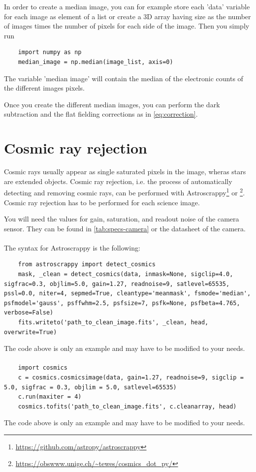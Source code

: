 \documentclass[a4paper, 11pt, fleqn]{memoir}
\begin{document}
In order to create a median image, you can for example store each 'data' variable for each image as element of a list or create a 3D array having size as the number of images times the number of pixels for each side of the image.
Then you simply run
\begin{verbatim}
    import numpy as np
    median_image = np.median(image_list, axis=0)
\end{verbatim}
The variable 'median image' will contain the median of the electronic counts of the different images pixels.


Once you create the different median images, you can perform the dark subtraction and the flat fielding corrections as in \cref{eq:correction}.

\section{Cosmic ray rejection}
\label{ssec:cosmic-ray-rejection}
Cosmic rays usually appear as single saturated pixels in the image, wheras stars are extended objects.
Cosmic ray rejection, i.e. the process of automatically detecting and removing cosmic rays, can be performed with Astroscrappy\footnote{\url{https://github.com/astropy/astroscrappy}} or \footnote{\url{https://obswww.unige.ch/~tewes/cosmics_dot_py/}}.
Cosmic ray rejection has to be performed for each science image.

You will need the values for gain, saturation, and readout noise of the camera sensor.
They can be found in \cref{tab:specs-camera} or the datasheet of the camera.

\paragraph{}
The syntax for Astroscrappy is the following:
\begin{verbatim}
    from astroscrappy import detect_cosmics
    mask, _clean = detect_cosmics(data, inmask=None, sigclip=4.0, sigfrac=0.3, objlim=5.0, gain=1.27, readnoise=9, satlevel=65535, pssl=0.0, niter=4, sepmed=True, cleantype='meanmask', fsmode='median', psfmodel='gauss', psffwhm=2.5, psfsize=7, psfk=None, psfbeta=4.765, verbose=False)
    fits.writeto('path_to_clean_image.fits', _clean, head, overwrite=True)
\end{verbatim}
The code above is only an example and may have to be modified to your needs.

\paragraph{}
\begin{verbatim}
    import cosmics
    c = cosmics.cosmicsimage(data, gain=1.27, readnoise=9, sigclip = 5.0, sigfrac = 0.3, objlim = 5.0, satlevel=65535)
    c.run(maxiter = 4)
    cosmics.tofits('path_to_clean_image.fits', c.cleanarray, head)
\end{verbatim}
The code above is only an example and may have to be modified to your needs.
\end{document}
